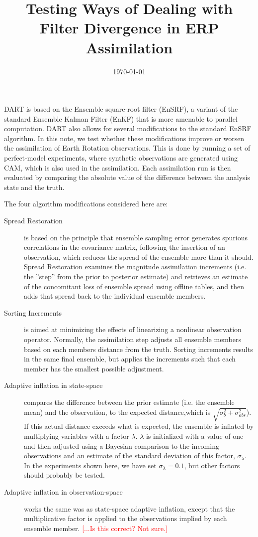 \documentclass[11pt]{report}
\title{Testing Ways of Dealing with Filter Divergence in ERP Assimilation}
\date{\today}
\begin{document}


\maketitle

DART is based on the Ensemble square-root filter (EnSRF), a variant of the standard Ensemble Kalman Filter (EnKF) that is more amenable to parallel computation.  
DART also allows for several modifications to the standard EnSRF algorithm.  
In this note, we test whether these modifications improve or worsen the assimilation of Earth Rotation observations.
This is done by running a set of perfect-model experiments, where synthetic observations are generated using CAM, which is also used in the assimilation.
Each assimilation run is then evaluated by comparing the absolute value of the difference between the analysis state and the truth.

The four algorithm modifications considered here are:

\begin{description}
%
\item [Spread Restoration] is based on the principle that ensemble sampling error generates spurious correlations in the covariance matrix, following the insertion of an observation, which reduces the spread of the ensemble more than it should.  Spread Restoration examines the magnitude assimilation increments (i.e. the ''step'' from the prior to posterior estimate) and retrieves an estimate of the concomitant loss of ensemble spread using offline tables, and then adds that spread back to the individual ensemble members.
%
\item [Sorting Increments]  is aimed at minimizing the effects of linearizing a nonlinear observation operator.  Normally, the assimilation step adjusts all ensemble members based on each members distance from the truth.  Sorting increments results in the same final ensemble, but applies the increments such that each member has the smallest possible adjustment.
%
\item [Adaptive inflation in state-space] compares the difference between the prior estimate (i.e. the ensemble mean) and the observation, to the expected distance,which is $\sqrt{\sigma_b^2 + \sigma_{obs}^2}$).  If this actual distance exceeds what is expected, the ensemble is inflated by multiplying variables with a factor $\lambda$.  $\lambda$ is initialized with a value of one and then adjusted using a Bayesian comparison to the incoming observations and an estimate of the standard deviation of this factor, $\sigma_{\lambda}$.  In the experiments shown here, we have set $\sigma_{\lambda} = 0.1$, but other factors should probably be tested.
%
\item [Adaptive inflation in observation-space] works the same was as state-space adaptive inflation, except that the multiplicative factor is applied to the observations implied by each ensemble member. \textcolor{red}{[...Is this correct?  Not sure.]}
%
\end{description}
\end{document}
